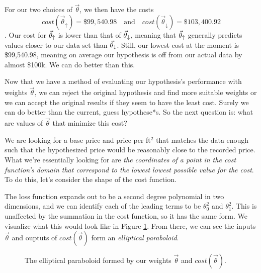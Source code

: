 For our two choices of $\vec\theta$, we then have the costs
\begin{equation*}
	cost(\vec\theta_{\uparrow})= \$99,540.98 \quad \text{and} \quad cost(\vec\theta_{\downarrow}) = \$103,400.92
\end{equation*}
. Our cost for $\vec\theta_{\uparrow}$ is lower than that of $\vec\theta_{\downarrow}$, meaning that $\vec\theta_{\uparrow}$ generally predicts values closer to our data set than $\vec\theta_{\downarrow}$. Still, our lowest cost at the moment is \$99,540.98, meaning on average our hypothesis is off from our actual data by almost \$100k. We can do better than this.

Now that we have a method of evaluating our hypothesis's performance with weights $\vec\theta$, we can reject the original hypothesis and find more suitable weights or we can accept the original results if they seem to have the least cost. Surely we can do better than the current, guess hypothese*s. So the next question is: what are values of $\vec\theta$ that minimize this cost?

We are looking for
a base price and price per ft$^2$ that matches the data enough such that the
hypothesized price would be reasonably close to the recorded price. What we're
essentially looking for are \emph{the coordinates of a point in the cost
function's domain that correspond to the lowest lowest possible value for the
cost}. To do this, let's consider the shape of the cost function.

The loss function expands out to be a second degree polynomial in two
dimensions, and we can identify each of the leading terms to be $\theta_0^2$ and
$\theta_1^2$. This is unaffected by the summation in the cost function, so it
has the same form. We visualize what this would look like in
Figure
\ref{fig:cost}. From there, we can see the inputs $\vec\theta$ and ouptuts of
$cost(\vec\theta)$ form an \emph{elliptical paraboloid}.

\begin{figure}[t!]
    \centering
    \caption{The elliptical paraboloid formed by our weights $\vec\theta$ and $cost(\vec\theta)$.}
    \label{fig:cost}
\end{figure}


